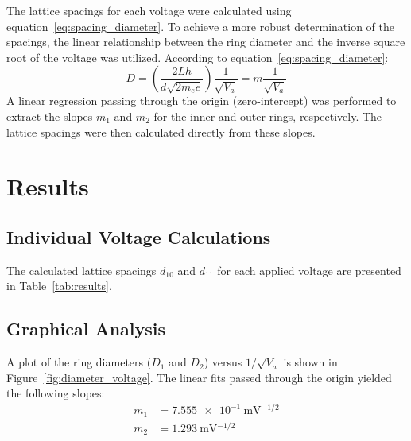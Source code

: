 \documentclass[journal]{IEEEtran}
\begin{document}
The lattice spacings for each voltage were calculated using equation~\eqref{eq:spacing_diameter}. To achieve a more robust determination of the spacings, the linear relationship between the ring diameter and the inverse square root of the voltage was utilized. According to equation~\eqref{eq:spacing_diameter}:
\begin{equation}
    D = \left( \frac{2 L h}{d \sqrt{2m_e e}} \right) \frac{1}{\sqrt{V_a}} = m \frac{1}{\sqrt{V_a}}
    \label{eq:linear_rel}
\end{equation}
A linear regression passing through the origin (zero-intercept) was performed to extract the slopes $m_1$ and $m_2$ for the inner and outer rings, respectively. The lattice spacings were then calculated directly from these slopes.

\section{Results}

\subsection{Individual Voltage Calculations}
The calculated lattice spacings $d_{10}$ and $d_{11}$ for each applied voltage are presented in Table~\ref{tab:results}.

\begin{table}[H]
    \centering
    \caption{Lattice Spacings at Various Voltages}
    \label{tab:results}
\end{table}

\subsection{Graphical Analysis}
A plot of the ring diameters ($D_1$ and $D_2$) versus $1/\sqrt{V_a}$ is shown in Figure~\ref{fig:diameter_voltage}. The linear fits passed through the origin yielded the following slopes:
\begin{align}
    m_1 &= \SI{7.555e-1}{\meter\volt^{-1/2}} \\
    m_2 &= \SI{1.293}{\meter\volt^{-1/2}}
\end{align}
\end{document}
